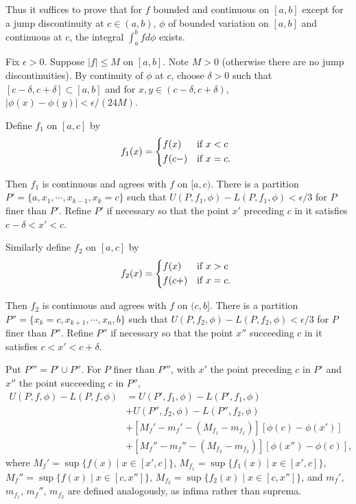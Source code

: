 \documentclass{article}
\begin{document}
Thus it suffices to prove that for $f$ bounded and continuous on $[a, b]$ except for a jump discontinuity at $c \in (a, b)$, $\phi$ of bounded variation on $[a, b]$ and continuous at $c$, the integral $\int_{a}^{b} f d \phi$ exists.

Fix $\epsilon > 0$. Suppose $\lvert f \rvert \leq M$ on $[a, b]$.
Note $M > 0$ (otherwise there are no jump discontinuities). By continuity of $\phi$ at $c$, choose $\delta > 0$ such that $[c - \delta, c + \delta] \subset [a, b]$ and for $x, y \in (c - \delta, c + \delta)$, $\lvert \phi(x) - \phi(y) \rvert < \epsilon / (24M)$.

Define $f_{1}$ on $[a, c]$ by
\[ f_{1}(x) = \begin{cases*}
		f(x) & if $x < c$ \\
		f(c-) & if $x = c$. 
		\end{cases*} \]


Then $f_{1}$ is continuous and agrees with $f$ on $[a, c)$. There is a partition $P' = \{a, x_{1}, \cdots, x_{k-1}, x_{k} = c \}$ such that $U(P, f_{1}, \phi) - L(P, f_{1}, \phi) < \epsilon / 3$ for $P$ finer than $P'$. Refine $P'$ if necessary so that the point $x'$ preceding $c$ in it satisfies $c - \delta < x' < c$.


Similarly define $f_{2}$ on $[a, c]$ by
\[ f_{2}(x) = \begin{cases*}
		f(x) & if $x > c$ \\
		f(c+) & if $x = c$. 
		\end{cases*} \]


Then $f_{2}$ is continuous and agrees with $f$ on $(c, b]$. There is a partition $P'' = \{x_{k} = c, x_{k+1}, \cdots, x_{n}, b \}$ such that $U(P, f_{2}, \phi) - L(P, f_{2}, \phi) < \epsilon / 3$ for $P$ finer than $P''$. Refine $P''$ if necessary so that the point $x''$ succeeding $c$ in it satisfies $c < x' < c + \delta$.

Put $P''' = P' \cup P''$. For $P$ finer than $P'''$, with $x'$ the point preceding $c$ in $P'$ and $x''$ the point succeeding $c$ in $P''$, 
\begin{align*}
	U(P, f, \phi) - L(P, f, \phi) &= U(P', f_{1}, \phi) - L(P', f_{1}, \phi) \\
    &+ U(P'', f_{2}, \phi) - L(P'', f_{2}, \phi) \\
	&+ [M_{f}' - m_{f}' - (M_{f_{1}} - m_{f_{1}})][\phi(c) - \phi(x')] \\
	&+ [M_{f}'' - m_{f}'' - (M_{f_{2}} - m_{f_{2}})][\phi(x'') - \phi(c)],
\end{align*}
where $M_{f}' = \sup \{ f(x) \mid x \in [x', c] \}$, $M_{f_{1}} = \sup \{ f_{1}(x) \mid x \in [x', c] \}$, $M_{f}'' = \sup \{ f(x) \mid x \in [c, x''] \}$, $M_{f_{2}} = \sup \{ f_{2}(x) \mid x \in [c, x''] \}$, and $m_{f}'$, $m_{f_{1}}$, $m_{f}''$, $m_{f_{2}}$ are defined analogously, as infima rather than suprema.
\end{document}
